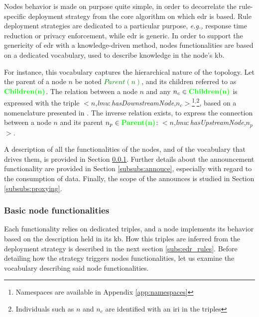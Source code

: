 \documentclass{iosart2c}
\newcommand{\added}[1]{\textcolor{green}{\textbf{#1}}}
\newcommand{\namespace}[1]{\textit{#1$:$}}
\newcommand{\concept}[2]{\namespace{#1}\-\textit{#2}}
\newcommand{\triplet}[3]{$<$#1,\textit{#2},#3$>$}
\begin{document}
Nodes behavior is made on purpose quite simple, in order to decorrelate the rule-specific deployment strategy from the core algorithm on which \gls{edr} is based.
Rule deployment strategies are dedicated to a particular purpose, \textit{e.g.,} response time reduction or privacy enforcement, while \gls{edr} is generic.
In order to support the genericity of \gls{edr} with a knowledge-driven method, nodes functionalities are based on a dedicated vocabulary, used to describe knowledge in the node's \gls{kb}.

For instance, this vocabulary captures the hierarchical nature of the topology.
Let the parent of a node $n$ be noted \added{$Parent(n)$}, and its children referred to as $\added{Children(n)}$.
The relation between a node $n$ and any $n_c\in \added{Children(n)}$ is expressed with the triple \triplet{$n$}{\concept{lmu}{has\-Downstream\-Node}}{$n_c$}\footnote{Namespaces are available in Appendix \ref{app:namespaces}}$^,$\footnote{Individuals such as $n$ and $n_c$ are identified with an \gls{iri} in the triples}, based on a nomenclature presented in \cite{Seydoux2017}. 
The inverse relation exists, to express the connection between a node $n$ and its parent $n_p\in \added{Parent(n)}$: \triplet{$n$}{\concept{lmu}{has\-Upstream\-Node}}{$n_p$}.

A description of all the functionalities of the nodes, and of the vocabulary that drives them, is provided in Section \textsection \ref{subsubs:basic_functionalities}. 
Further details about the announcement functionality are provided in Section \textsection \ref{subsubs:annouce}, especially with regard to the consumption of data.
Finally, the scope of the announces is studied in Section \textsection \ref{subsubs:proxying}.

\subsubsection{Basic node functionalities}
\label{subsubs:basic_functionalities}

Each functionality relies on dedicated triples, and a node implements its behavior based on the description held in its \gls{kb}.
How this triples are inferred from the deployment strategy is described in the next section \textsection \ref{subs:edr_rules}.
Before detailing how the strategy triggers nodes functionalities, let us examine the vocabulary describing said node functionalities.
\end{document}
